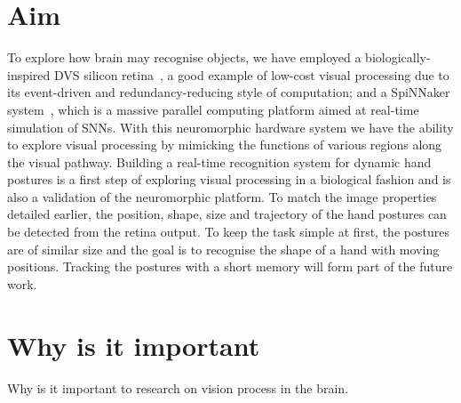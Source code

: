 \section{Aim}
\label{sec:aim}
To explore how brain may recognise objects, we have employed a biologically-inspired DVS silicon retina~\cite{lenero20113}, a good example of low-cost visual processing due to its event-driven and redundancy-reducing style of computation;
and a SpiNNaker system~\cite{furber2014spinnaker}, which is a massive parallel computing platform aimed at real-time simulation of SNNs. 
With this neuromorphic hardware system we have the ability to explore visual processing by mimicking the functions of various regions along the visual pathway. 
Building a real-time recognition system for dynamic hand postures is a first step of exploring visual processing in a biological fashion and is also a validation of the neuromorphic platform.
To match the image properties detailed earlier, the position, shape, size and trajectory of the hand postures can be detected from the retina output.
To keep the task simple at first, the postures are of similar size and the goal is to recognise the shape of a hand with moving positions.
Tracking the postures with a short memory will form part of the future work.



\section{Why is it important}
\label{sec:imp}
Why is it important to research on vision process in the brain.